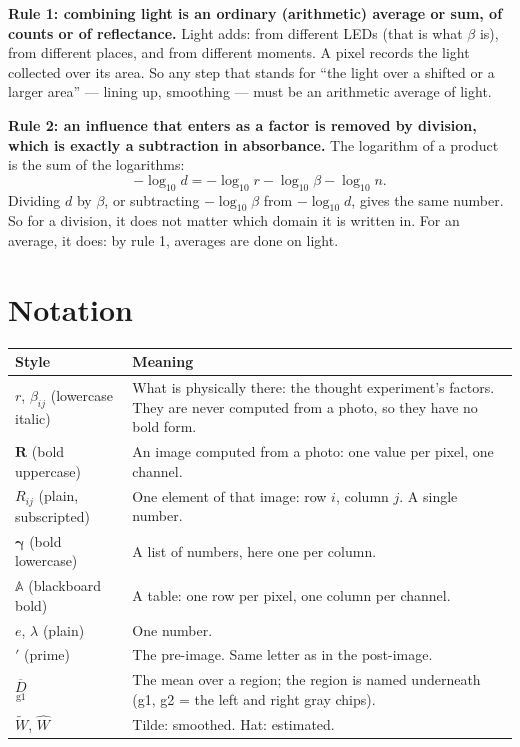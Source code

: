 \documentclass[11pt,letter]{article}
\newcommand{\iR}{\mathbf{R}}   %
\newcommand{\tblA}{\mathbb{A}} %
\newcommand{\vgamma}{\bm{\gamma}}
\newcommand{\reg}[2]{\underset{\text{#1}}{#2}}
\newcommand{\avg}[2]{\overline{\reg{#1}{#2}}}
\newcommand{\Lten}{\log_{10}}
\begin{document}
\textbf{Rule 1: combining light is an ordinary (arithmetic) average or sum,
of counts or of reflectance.}  Light adds: from different LEDs (that is
what $\beta$ is), from different places, and from different moments.  A pixel
records the light collected over its area.  So any step that stands for
``the light over a shifted or a larger area'' --- lining up, smoothing ---
must be an arithmetic average of light.

\textbf{Rule 2: an influence that enters as a factor is removed by
division, which is exactly a subtraction in absorbance.}  The logarithm of
a product is the sum of the logarithms:
\begin{equation}
  -\Lten d = -\Lten r - \Lten \beta - \Lten n .
  \label{eq:log}
\end{equation}
Dividing $d$ by $\beta$, or subtracting $-\Lten \beta$ from $-\Lten d$, gives the
same number.  So for a division, it does not matter which domain it is
written in.  For an average, it does: by rule 1, averages are done on light.

\section{Notation}
\label{sec:notation}

\begin{tabular}{@{}L{3.4cm}L{11.4cm}@{}}
\toprule
Style & Meaning \\
\midrule
$r$, $\beta_{ij}$ (lowercase italic) & What is physically there: the
  thought experiment's factors.  They are never computed from a photo, so
  they have no bold form. \\
$\iR$ (bold uppercase) & An image computed from a photo: one value per
  pixel, one channel. \\
$R_{ij}$ (plain, subscripted) & One element of that image: row $i$,
  column $j$.  A single number. \\
$\vgamma$ (bold lowercase) & A list of numbers, here one per column. \\
$\tblA$ (blackboard bold) & A table: one row per pixel, one column per
  channel. \\
$e$, $\lambda$ (plain) & One number. \\
$'$ (prime) & The pre-image.  Same letter as in the post-image. \\
$\avg{g1}{D}$ & The mean over a region; the region is named underneath
  (g1, g2 = the left and right gray chips). \\
$\widetilde W$, $\widehat W$ & Tilde: smoothed.  Hat: estimated. \\
\bottomrule
\end{tabular}
\end{document}
